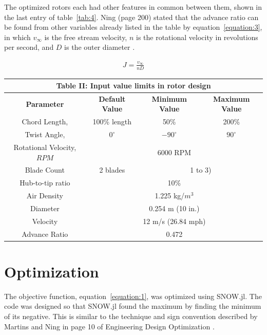 \documentclass[journal ]{new-aiaa}
\begin{document}
The optimized rotors each had other features in common between them, shown in the last entry of table~\eqref{tab:4}. Ning (page 200) stated that the advance ratio can be found from other variables already listed in the table by equation~\eqref{equation:3}, in which $v_{\infty}$ is the free stream velocity, $n$ is the rotational velocity in revolutions per second, and $D$ is the outer diameter \cite{ComAer}.

\begin{equation}
	\begin{aligned}
	\label{equation:3}
	J = \frac{v_{\infty}}{n D}
	\end{aligned}
\end{equation}

\begin{center}
\begin{tabular}{| c | c | c | c |}
	\multicolumn{4}{c}{Table II: Input value limits in rotor design} \\ \hline
  	 \textbf{Parameter} & \textbf{Default Value} & \textbf{Minimum Value} & \textbf{Maximum Value} \\ \hline
	 Chord Length, & 100\% length & 50\% & 200\% \\ \hline
	 Twist Angle, & $0^{\circ}$ & $-90^{\circ}$ & $90^{\circ}$ \\ \hline \hline
	 Rotational Velocity, $RPM$ & \multicolumn{3}{c|}{6000 RPM} \\ \hline
	 Blade Count & 2 blades & \multicolumn{2}{c|}{1 to 3)}\\ \hline
	 Hub-to-tip ratio & \multicolumn{3}{c|}{10\%} \\ \hline
	 Air Density & \multicolumn{3}{c|}{1.225 kg/$m^{3}$} \\ \hline
	 Diameter & \multicolumn{3}{c|}{0.254 m (10 in.)} \\ \hline
	 Velocity & \multicolumn{3}{c|}{12 m/s (26.84 mph)} \\ \hline
	 Advance Ratio & \multicolumn{3}{c|}{0.472} \\ \hline
\end{tabular}
\label{tab:4}
\end{center}

\section{Optimization}

The objective function, equation~\eqref{equation:1}, was optimized using SNOW.jl. The code was designed so that SNOW.jl found the maximum by finding the minimum of its negative. This is similar to the technique and sign convention described by Martins and Ning in page 10 of Engineering Design Optimization \cite{EngDesOpt}.
\end{document}
